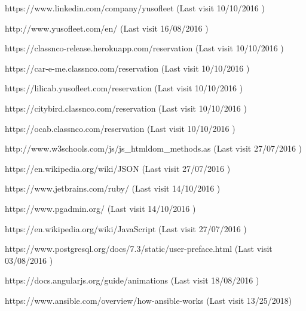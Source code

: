 
\renewcommand\bibname{Netography}

\begin{thebibliography}{9}



https://www.linkedin.com/company/yusofleet (Last visit 10/10/2016 )

http://www.yusofleet.com/en/ (Last visit 16/08/2016 )

https://classnco-release.herokuapp.com/reservation (Last visit 10/10/2016 )

https://car-e-me.classnco.com/reservation (Last visit 10/10/2016 )

https://lilicab.yusofleet.com/reservation (Last visit 10/10/2016 )

https://citybird.classnco.com/reservation (Last visit 10/10/2016 )

https://ocab.classnco.com/reservation (Last visit 10/10/2016 )


http://www.w3schools.com/js/js\_htmldom\_methods.as (Last visit 27/07/2016 )

https://en.wikipedia.org/wiki/JSON (Last visit 27/07/2016 )



https://www.jetbrains.com/ruby/ (Last visit 14/10/2016 )

https://www.pgadmin.org/ (Last visit 14/10/2016 )

https://en.wikipedia.org/wiki/JavaScript (Last visit 27/07/2016 )

https://www.postgresql.org/docs/7.3/static/user-preface.html (Last visit 03/08/2016 )

https://docs.angularjs.org/guide/animations (Last visit 18/08/2016 )

https://www.ansible.com/overview/how-ansible-works (Last visit 13/25/2018)

\end{thebibliography}


